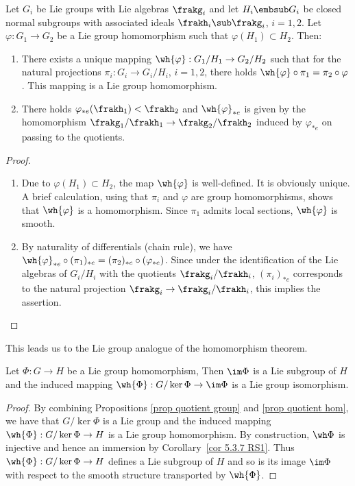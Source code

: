 \begin{prop}\label{prop quotient hom}
    Let $G_i$ be Lie groups with Lie algebras $\frakg_i$ and let $H_i\embsub G_i$ be closed normal subgroups with associated ideals $\frakh_i\sub \frakg_i$, $i=1,2$. Let $\varphi:G_1\to G_2$ be a Lie group homomorphism such that $\varphi(H_1)\subset H_2$. Then:
    \begin{enumerate}
        \item There exists a unique mapping $\wh{\varphi}:G_1\slash H_1\to G_2\slash H_2$ such that for the natural projections $\pi_i:G_i\to G_i\slash H_i$, $i=1,2$, there holds $\wh{\varphi}\circ\pi_1=\pi_2\circ \varphi$. This mapping is a Lie group homomorphism.
        \item There holds $\varphi_{\ast e}(\frakh_1)<\frakh_2$ and $\wh{\varphi}_{\ast e}$ is given by the homomorphism $\frakg_1\slash\frakh_1\to \frakg_2\slash\frakh_2$ induced by $\varphi_{\ast e}$ on passing to the quotients.
    \end{enumerate}
\end{prop}
\begin{proof}
    \begin{enumerate}
        \item Due to $\varphi(H_1)\subset H_2$, the map $\wh{\varphi}$ is well-defined. It is obviously unique. A brief calculation, using that $\pi_i$ and $\varphi$ are group homomorphisms, shows that $\wh{\varphi}$ is a homomorphism. Since $\pi_1$ admits local sections, $\wh{\varphi}$ is smooth.
        \item By naturality of differentials (chain rule), we have $\wh{\varphi}_{\ast e}\circ (\pi_1)_{\ast e}=(\pi_2)_{\ast e}\circ (\varphi_{\ast e})$. Since under the identification of the Lie algebras of $G_i\slash H_i$ with the quotients $\frakg_i\slash \frakh_i$, $(\pi_i)_{\ast e}$ corresponds to the natural projection $\frakg_i\to \frakg_i\slash \frakh_i$, this implies the assertion.
    \end{enumerate}
\end{proof}

This leads us to the Lie group analogue of the homomorphism theorem.

\begin{prop}
    Let $\Phi:G\to H$ be a Lie group homomorphism, Then $\im\Phi$ is a Lie subgroup of $H$ and the induced mapping $\wh{\Phi}:G\slash \ker \Phi\to \im\Phi$ is a Lie group isomorphism.
\end{prop}
\begin{proof}
    By combining Propositions \ref{prop quotient group} and \ref{prop quotient hom}, we have that $G\slash \ker\Phi$  is a Lie group and the induced mapping $\wh{\Phi}:G\slash\ker\Phi\to H$ is a Lie group homomorphism. By construction, $\wh\Phi$ is injective and hence an immersion by Corollary~\ref{cor 5.3.7 RS1}. Thus $\wh{\Phi}:G\slash \ker\Phi\to H$ defines a Lie subgroup of $H$ and so is its image $\im\Phi$ with  respect to the smooth structure transported by $\wh{\Phi}$.
\end{proof}


